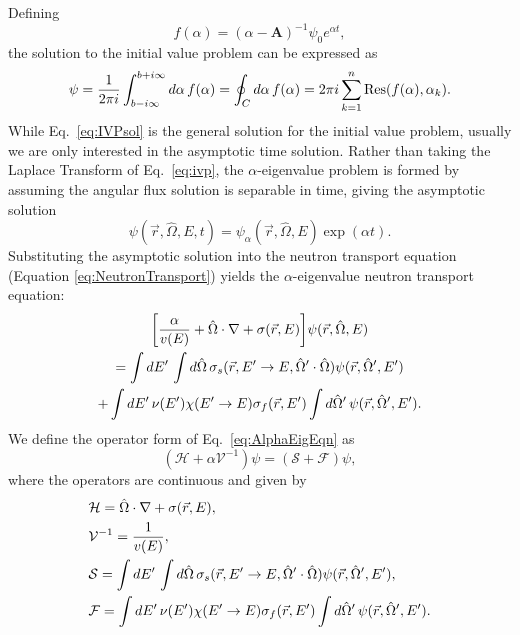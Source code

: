 Defining
\begin{equation}
f(\alpha) = (\alpha - \mathbf{A})^{-1}\psi_{0} e^{\alpha t},
\end{equation}
the solution to the initial value problem can be expressed as
\begin{equation}
	\psi = \frac{1}{2\pi i} \int_{b - i\infty}^{b + i\infty} \mathop{}\!d \alpha \, f(\alpha) = \oint_{C} \mathop{}\!d \alpha \, f(\alpha) = 2 \pi i \sum_{k=1}^{n} \text{Res}(f(\alpha),\alpha_{k}).
	\label{eq:IVPsol}
\end{equation}
While Eq.~\ref{eq:IVPsol} is the general solution for the initial value problem, usually we are only interested in the asymptotic time solution. Rather than taking the Laplace Transform of Eq.~\ref{eq:ivp}, the $\alpha$-eigenvalue problem is formed by assuming the angular flux solution is separable in time, giving the asymptotic solution
\begin{equation}
	\psi(\vec{r},\hat{\Omega},E,t) = \psi_{\alpha}(\vec{r},\hat{\Omega},E) \exp(\alpha t).
\end{equation}
Substituting the asymptotic solution into the neutron transport equation (Equation \ref{eq:NeutronTransport}) yields the $\alpha$-eigenvalue neutron transport equation:
\begin{multline}
	\bigg [ \frac{\alpha}{v(E)} + \hat{\Omega} \cdot \nabla + \sigma(\vec{r},E) \bigg ] \psi(\vec{r},\hat{\Omega},E) \\ = \int \mathop{}\!d E' \, \int \mathop{}\!d \hat{\Omega} \, \sigma_{s}(\vec{r},E'\rightarrow E,\hat{\Omega}' \cdot \hat{\Omega}) \psi(\vec{r},\hat{\Omega}',E') \\ + \int \mathop{}\!d E' \, \nu(E') \chi(E'\rightarrow E) \sigma_{f}(\vec{r},E') \int \mathop{}\!d \hat{\Omega}' \, \psi(\vec{r},\hat{\Omega}',E').
	\label{eq:AlphaEigEqn}
\end{multline}
We define the operator form of Eq.~\ref{eq:AlphaEigEqn} as
\begin{equation}
(\mathcal{H} + \alpha \mathcal{V}^{-1}) \psi = ( \mathcal{S} + \mathcal{F} ) \psi,
\label{eq:OpFormAlpha}
\end{equation}
where the operators are continuous and given by
\begin{equation}
	\begin{split}
		& \mathcal{H} = \hat{\Omega} \cdot \nabla + \sigma(\vec{r},E), \\
		& \mathcal{V}^{-1} = \frac{1}{v(E)}, \\
		& \mathcal{S} = \int \mathop{}\!d E' \, \int \mathop{}\!d \hat{\Omega} \, \sigma_{s}(\vec{r},E'\rightarrow E,\hat{\Omega}' \cdot \hat{\Omega}) \psi(\vec{r},\hat{\Omega}',E'), \\
		& \mathcal{F} = \int \mathop{}\!d E' \, \nu(E') \chi(E'\rightarrow E) \sigma_{f}(\vec{r},E') \int \mathop{}\!d \hat{\Omega}' \, \psi(\vec{r},\hat{\Omega}',E').
	\end{split}
\end{equation}

